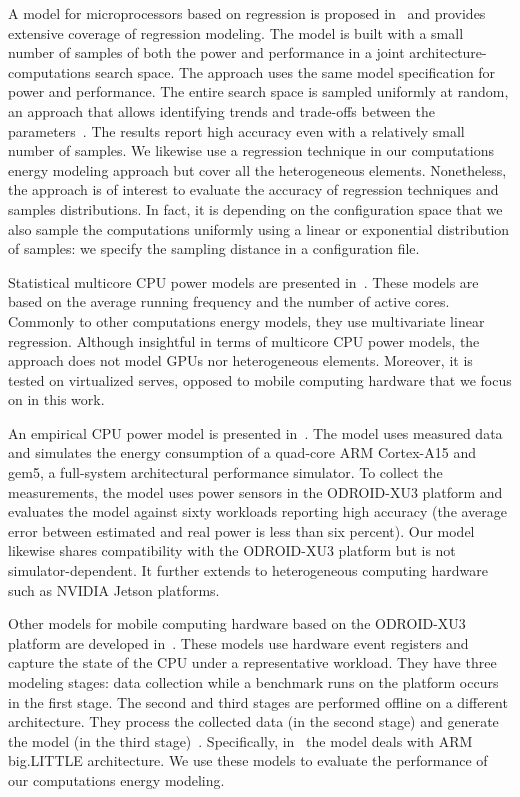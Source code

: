 A model for microprocessors based on regression is proposed in~\citep{lee2006statistically,lee2006accurate} and provides extensive coverage of regression modeling. The model is built with a small number of samples of both the power and performance in a joint architecture-computations search space. The approach uses the same model specification for power and performance. The entire search space is sampled uniformly at random, an approach that allows identifying trends and trade-offs between the parameters~\citep{lee2006accurate}. The results report high accuracy even with a relatively small number of samples. We likewise use a regression technique in our computations energy modeling approach but cover all the heterogeneous elements. Nonetheless, the approach is of interest to evaluate the accuracy of regression techniques and samples distributions. In fact, it is depending on the configuration space that we also sample the computations uniformly using a linear or exponential distribution of samples: we specify the sampling distance in a configuration file. 

Statistical multicore CPU power models are presented in~\citep{takouna2011accurate}. These models are based on the average running frequency and the number of active cores. Commonly to other computations energy models, they use multivariate linear regression. Although insightful in terms of multicore CPU power models, the approach does not model GPUs nor heterogeneous elements. Moreover, it is tested on virtualized serves, opposed to mobile computing hardware that we focus on in this work. 

An empirical CPU power model is presented in~\citep{reddy2017empirical}. The model uses measured data and simulates the energy consumption of a quad-core ARM Cortex-A15 and gem5, a full-system architectural performance simulator. To collect the measurements, the model uses power sensors in the ODROID-XU3 platform and evaluates the model against sixty workloads reporting high accuracy (the average error between estimated and real power is less than six percent). Our model likewise shares compatibility with the ODROID-XU3 platform but is not simulator-dependent. It further extends to heterogeneous computing hardware such as NVIDIA Jetson platforms. 
 
Other models for mobile computing hardware based on the ODROID-XU3 platform are developed in~\citep{nunez2013enabling, nikov2015evaluation}. These models use hardware event registers and capture the state of the CPU under a representative workload. They have three modeling stages: data collection while a benchmark runs on the platform occurs in the first stage. The second and third stages are performed offline on a different architecture. They process the collected data (in the second stage) and generate the model (in the third stage)~\citep{seewald2019coarse}. Specifically, in~\citep{nikov2015evaluation} the model deals with ARM big.LITTLE architecture. We use these models to evaluate the performance of our computations energy modeling.


